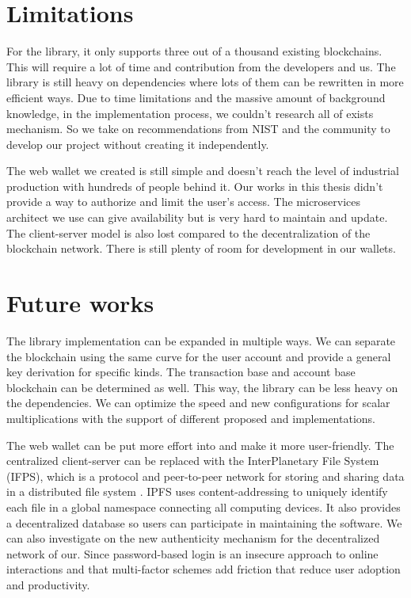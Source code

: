 \section{Limitations}

For the library, it only supports three out of a thousand existing blockchains. This will require a lot of time and contribution from the developers and us. The library is still heavy on dependencies where lots of them can be rewritten in more efficient ways. Due to time limitations and the massive amount of background knowledge, in the implementation process, we couldn't research all of exists mechanism. So we take on recommendations from NIST and the community to develop our project without creating it independently.


The web wallet we created is still simple and doesn't reach the level of industrial production with hundreds of people behind it. Our works in this thesis didn't provide a way to authorize and limit the user's access. The microservices architect we use can give availability but is very hard to maintain and update. The client-server model is also lost compared to the decentralization of the blockchain network. There is still plenty of room for development in our wallets.

\section{Future works}

The library implementation can be expanded in multiple ways. We can separate the blockchain using the same curve for the user account and provide a general key derivation for specific kinds. The transaction base and account base blockchain can be determined as well. This way, the library can be less heavy on the dependencies. We can optimize the speed and new configurations for scalar multiplications with the support of different proposed and implementations. 


The web wallet can be put more effort into and make it more user-friendly. The centralized client-server can be replaced with the InterPlanetary File System (IFPS), which is a protocol and peer-to-peer network for storing and sharing data in a distributed file system \cite{ifps}. IPFS uses content-addressing to uniquely identify each file in a global namespace connecting all computing devices. It also provides a decentralized database so users can participate in maintaining the software. We can also investigate on the new authenticity mechanism for the decentralized network of our. Since password-based login is an insecure approach to online interactions and that multi-factor schemes add friction that reduce user adoption and productivity. 
